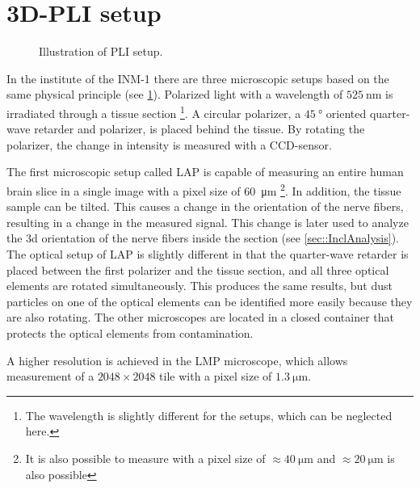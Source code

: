 \section{3D-PLI setup}\label{sec:expSetup}
%
\begin{figure}[!t]
    \captionsetup[sub]{position=top}
    \setlength{\tikzwidth}{\textwidth}
	\centering
	\caption{Illustration of PLI setup.}
	\label{fig:pli_setup}
\end{figure}
%
In the institute of the \ac{INM-1} there are three microscopic setups based on the same physical principle \cite{Axer2011} (see \cref{fig:pli_setup}).
Polarized light with a wavelength of $\SI{525}{\nano\meter}$ is irradiated through a tissue section \footnote{The wavelength is slightly different for the setups, which can be neglected here.}.
A circular polarizer, a $\SI{45}{\degree}$ oriented quarter-wave retarder and polarizer, is placed behind the tissue.
By rotating the polarizer, the change in intensity is measured with a \ac{CCD}-sensor.
\par
%
The first microscopic setup called \ac{LAP} is capable of measuring an entire human brain slice in a single image with a pixel size of \SI{60}{\micro\meter} \footnote{It is also possible to measure with a pixel size of $\approx \SI{40}{\micro\meter}$ and $\approx \SI{20}{\micro\meter}$ is also possible}.
In addition, the tissue sample can be tilted.
This causes a change in the orientation of the nerve fibers, resulting in a change in the measured signal.
This change is later used to analyze the 3d orientation of the nerve fibers inside the section (see \cref{sec::InclAnalysis}).
The optical setup of \ac{LAP} is slightly different in that the quarter-wave retarder is placed between the first polarizer and the tissue section, and all three optical elements are rotated simultaneously.
This produces the same results, but dust particles on one of the optical elements can be identified more easily because they are also rotating.
The other microscopes are located in a closed container that protects the optical elements from contamination.
\par
% 
A higher resolution is achieved in the \ac{LMP} microscope, which allows measurement of a $\num{2048}\times\num{2048}$ tile with a pixel size of $\SI{1.3}{\micro\meter}$.
